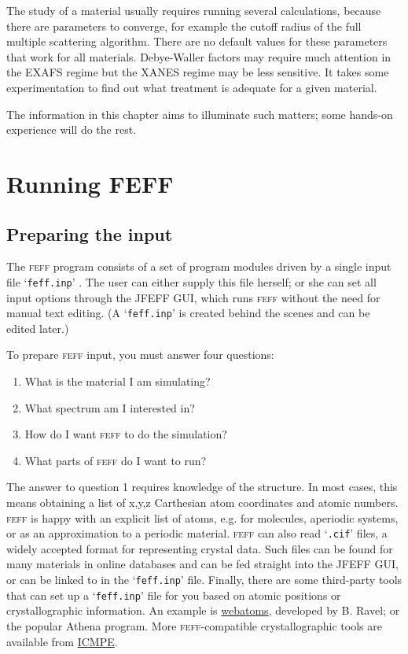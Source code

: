 \documentclass[11pt,oneside]{report} %
\renewcommand{\htmladdnormallink}[2]{\href{#2}{#1}}
\newcommand{\program}[1]{\textsc{#1}}
\newcommand{\feff}{\program{feff}}
\newcommand{\file}[1]{`\texttt{#1}'}
\begin{document}
The study of a material usually requires running several calculations, because there are parameters to converge, for example the cutoff radius of the full multiple scattering algorithm.  There are no default values for these parameters that work for all materials.  Debye-Waller factors may require much attention in the EXAFS regime but the XANES regime may be less sensitive.  It takes some experimentation to find out what treatment is adequate for a given material.

The information in this chapter aims to illuminate such matters; some hands-on experience will do the rest.


\section{Running FEFF}

\subsection{Preparing the input}
The {\feff} program consists of a set of program modules driven by a single input file \file{feff.inp} .  The user can either supply this file herself; or she can set all input options through the JFEFF GUI, which runs {\feff} without the need for manual text editing.  (A {\file{feff.inp}} is created behind the scenes and can be edited later.)

To prepare {\feff} input, you must answer four questions:
\begin{enumerate}

\item What is the material I am simulating?
\item What spectrum am I interested in?
\item How do I want {\feff} to do the simulation?
\item What parts of {\feff} do I want to run?
\end{enumerate}

The answer to question 1 requires knowledge of the structure.  In most cases, this means obtaining a list of x,y,z Carthesian atom coordinates and atomic numbers.  {\feff} is happy with an explicit list of atoms, e.g. for molecules, aperiodic systems, or as an approximation to a periodic material.  {\feff} can also read \file{.cif} files, a widely accepted format for representing crystal data.  Such files can be found for many materials in online databases and can be fed straight into the JFEFF GUI, or can be linked to in the \file{feff.inp} file.  Finally, there are some third-party tools that can set up a \file{feff.inp} file for you based on atomic positions or crystallographic information.  An example is \htmladdnormallink
{webatoms}{http://cars9.uchicago.edu/~ravel/software/aboutatoms.html}, developed by B. Ravel; or the popular Athena program.    More {\feff}-compatible crystallographic tools are available from \htmladdnormallink{ICMPE}{http://www.icmpe.cnrs.fr/spip.php?article578&lang=fr}.
\end{document}

